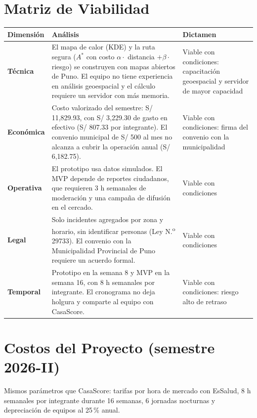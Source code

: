 \documentclass[11pt,a4paper]{article}
\begin{document}
\section{Matriz de Viabilidad}
{\small
\noindent\begin{tabularx}{\textwidth}{@{}P{2.3cm} L P{2.6cm}@{}}
\toprule
{}
\textbf{Dimensión} & \textbf{Análisis} & \textbf{Dictamen} \\
\midrule
\textbf{Técnica} & El mapa de calor (KDE) y la ruta segura ($A^*$ con costo $\alpha \cdot$ distancia $+ \beta \cdot$ riesgo) se construyen con mapas abiertos de Puno. El equipo no tiene experiencia en análisis geoespacial y el cálculo requiere un servidor con más memoria. & Viable con condiciones: capacitación geoespacial y servidor de mayor capacidad \\
\addlinespace[2pt]
\textbf{Económica} & Costo valorizado del semestre: S/ 11,829.93, con S/ 3,229.30 de gasto en efectivo (S/ 807.33 por integrante). El convenio municipal de S/ 500 al mes no alcanza a cubrir la operación anual (S/ 6,182.75). & Viable con condiciones: firma del convenio con la municipalidad \\
\addlinespace[2pt]
\textbf{Operativa} & El prototipo usa datos simulados. El MVP depende de reportes ciudadanos, que requieren 3 h semanales de moderación y una campaña de difusión en el cercado. & Viable con condiciones \\
\addlinespace[2pt]
\textbf{Legal} & Solo incidentes agregados por zona y horario, sin identificar personas (Ley N.\textsuperscript{o} 29733). El convenio con la Municipalidad Provincial de Puno requiere un acuerdo formal. & Viable con condiciones \\
\addlinespace[2pt]
\textbf{Temporal} & Prototipo en la semana 8 y MVP en la semana 16, con 8 h semanales por integrante. El cronograma no deja holgura y comparte al equipo con CasaScore. & Viable con condiciones: riesgo alto de retraso \\
\bottomrule
\end{tabularx}
}

\section{Costos del Proyecto (semestre 2026-II)}
Mismos parámetros que CasaScore: tarifas por hora de mercado con EsSalud, 8 h semanales por integrante durante 16 semanas, 6 jornadas nocturnas y depreciación de equipos al 25\,\% anual.
\end{document}
